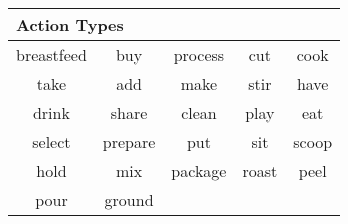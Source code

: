 \documentclass[journal]{IEEEtran}
\begin{document}
\begin{table}[t]
{\begin{tabular}{@{}ccccc@{}}
\multicolumn{5}{l}{\textbf{Action Types}}                                                                                                                          \\ \midrule
\multicolumn{1}{c|}{breastfeed} & \multicolumn{1}{c|}{buy}            & \multicolumn{1}{c|}{process}        & \multicolumn{1}{c|}{cut}              & cook         \\
\multicolumn{1}{c|}{take}       & \multicolumn{1}{c|}{add}            & \multicolumn{1}{c|}{make}           & \multicolumn{1}{c|}{stir}             & have         \\
\multicolumn{1}{c|}{drink}      & \multicolumn{1}{c|}{share}          & \multicolumn{1}{c|}{clean}          & \multicolumn{1}{c|}{play}             & eat          \\
\multicolumn{1}{c|}{select}     & \multicolumn{1}{c|}{prepare}        & \multicolumn{1}{c|}{put}            & \multicolumn{1}{c|}{sit}              & scoop        \\
\multicolumn{1}{c|}{hold}       & \multicolumn{1}{c|}{mix}            & \multicolumn{1}{c|}{package}        & \multicolumn{1}{c|}{roast}            & peel         \\
\multicolumn{1}{c|}{pour}       & \multicolumn{1}{c|}{ground}         &                                     &                                       &              \\ \bottomrule
\end{tabular}%
}

\end{table}
\end{document}
